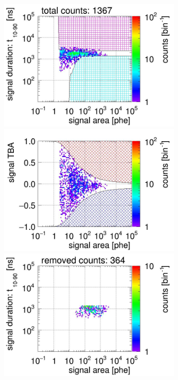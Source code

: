 \begin{landscape}
\begin{figure}[!p]
\begin{subfigure}[t]{0.32\textwidth}
		\includegraphics[width=\figurewidth,clip,trim={0 98 0 15}]{Figures/GasTest/CutsValid/res64767/pdpa14Vecfig64767.jpg}
		\includegraphics[width=\figurewidth,clip,trim={0 98 0 40}]{Figures/GasTest/CutsValid/res64767/tbapa14Vecfig64767.jpg}
		\includegraphics[width=\figurewidth,clip,trim={0 98 0 15}]{Figures/GasTest/CutsValid/res64767/pdpaX14Vecfig64767.jpg}

\end{subfigure}
\end{figure}
\end{landscape}
